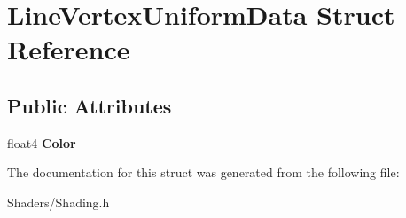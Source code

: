 \hypertarget{structLineVertexUniformData}{}\section{Line\+Vertex\+Uniform\+Data Struct Reference}
\label{structLineVertexUniformData}
\subsection*{Public Attributes}
\begin{DoxyCompactItemize}
\item 
\mbox{\label{structLineVertexUniformData_a34a4ba4690bd2b1151fc60ef83f9b8c9}} 
float4 {\bfseries Color}
\end{DoxyCompactItemize}


The documentation for this struct was generated from the following file\+:\begin{DoxyCompactItemize}
\item 
Shaders/Shading.\+h\end{DoxyCompactItemize}
